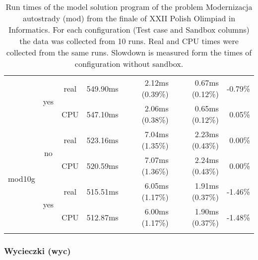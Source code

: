 \documentclass[en]{pracamgr}
\begin{document}
\begin{small}
\begin{longtable}{|l|c|c|r|r|r|r|}
                          \cline{2-7}
                          & \multirow{2}{*}{yes} & real & 549.90ms & 2.12ms (0.39\%) & 0.67ms (0.12\%) & -0.79\% \\*
                          &                      & CPU  & 547.10ms & 2.06ms (0.38\%) & 0.65ms (0.12\%) & 0.05\% \\
\hline
\multirow{4}{*}{mod10g}   & \multirow{2}{*}{no}  & real & 523.16ms & 7.04ms (1.35\%) & 2.23ms (0.43\%) & 0.00\% \\*
                          &                      & CPU  & 520.59ms & 7.07ms (1.36\%) & 2.24ms (0.43\%) & 0.00\% \\*
                          \cline{2-7}
                          & \multirow{2}{*}{yes} & real & 515.51ms & 6.05ms (1.17\%) & 1.91ms (0.37\%) & -1.46\% \\*
                          &                      & CPU  & 512.87ms & 6.00ms (1.17\%) & 1.90ms (0.37\%) & -1.48\% \\
\hline
\caption{Run times of the model solution program of the problem Modernizacja autostrady (mod) from the finale of XXII Polish Olimpiad in Informatics. For each configuration (Test case and Sandbox columns) the data was collected from 10 runs. Real and CPU times were collected from the same runs. Slowdown is measured form the times of configuration without sandbox.}
\label{table:mod_model_solution_runtimes}
\end{longtable}
\end{small}

\subsubsection{Wycieczki (wyc)}
\end{document}

